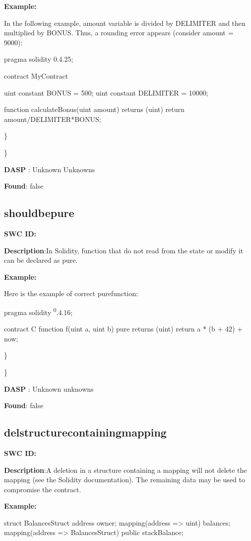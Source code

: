 \documentclass{article}
\begin{document}
{\textbf{Example:} 

In the following example, amount variable is divided by DELIMITER and then multiplied by BONUS. Thus, a rounding error appears (consider amount = 9000):

pragma solidity 0.4.25;

contract MyContract {

    uint constant BONUS = 500;
    uint constant DELIMITER = 10000;

    function calculateBonus(uint amount) returns (uint) {
        return amount/DELIMITER*BONUS;
    }
}

\} 

\} 

\textbf{DASP} : Unknown Unknowns

\textbf{Found}: false

\subsection{should\textunderscore be\textunderscore pure} 
\textbf{SWC \textunderscore ID:} 

\textbf{Description}:In Solidity, function that do not read from the state or modify it can be declared as pure.


\textbf{Example:} 

Here is the example of correct pure\textendash function:

pragma solidity \textsuperscript0.4.16;

contract C {
    function f(uint a, uint b) pure returns (uint) {
        return a * (b + 42) + now;
    }
}

\} 

\} 

\textbf{DASP} : Unknown unknowns

\textbf{Found}: false

\subsection{del\textunderscore structure\textunderscore containing\textunderscore mapping} 
\textbf{SWC \textunderscore ID:} 

\textbf{Description}:A deletion in a structure containing a mapping will not delete the mapping (see the Solidity documentation). The remaining data may be used to compromise the contract.


\textbf{Example:} 

struct BalancesStruct{
    address owner;
    mapping(address => uint) balances;
}
mapping(address => BalancesStruct) public stackBalance;

}
\end{document}
